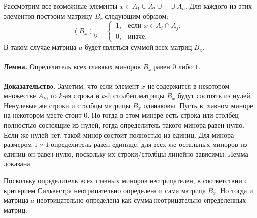 \documentclass{article}
\begin{document}
Рассмотрим все возможные элементы $x \in A_1 \cup A_2 \cup \cdots \cup A_n$. Для каждого из этих элементов построим матрицу $B_x$ следующим образом:
$$(B_x)_{ij} = \begin{cases}1,&\textrm{если }x \in A_i \cap A_j;\\0,&\textrm{иначе}.\end{cases}$$
В таком случае матрица $a$ будет являться суммой всех матриц $B_x$. \\\\
\textbf{Лемма.} Определитель всех главных миноров $B_x$ равен $0$ либо $1$.\\\\
\textbf{Доказательство.} Заметим, что если элемент $x$ не содержится в некотором множестве $A_k$, то $k$-ая строка и $k$-й столбец матрицы $B_x$ будут состоять из нулей. 
Ненулевые же строки и столбцы матрицы $B_x$ одинаковы. Пусть в главном миноре на некотором месте стоит $0$. Но тогда в этом миноре есть строка или столбец полностью состоящие из нулей, тогда определитель такого минора равен нулю. 
Если же нулей нет, такой минор состоит полностью из единиц. Для минора размером $1 \times 1$ определитель равен единице, для всех же 
остальных миноров из единиц он равен нулю, поскольку их строки/столбцы линейно зависимы. Лемма доказана.

Поскольку определитель всех главных миноров неотрицателен, в соответствии с критерием Сильвестра неотрицательно определена и сама матрица $B_x$. 
Но тогда и матрица $a$ неотрицательно определена как сумма неотрицательно определенных матриц.
\end{document}
